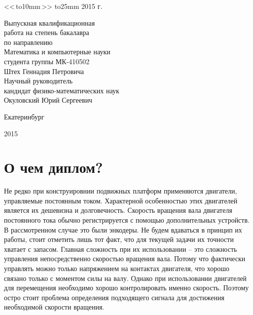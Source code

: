 \documentclass[14pt]{extreport}
\begin{document}
\begin{titlepage}
{\begin{parbox}[t]{9cm}
{                <<\,\hbox to10mm{\hrulefill}\,>>  \hbox to25mm{\hrulefill}  2015 г.
            }
            \end{parbox}
            \begin{parbox}[t]{9cm}{\small  {}
                Выпускная квалификационная \\
                работа на степень бакалавра\\
                 по направлению\\
                Математика и компьютерные науки\\
                студента группы МК-410502 \\
                                \bigskip
                Штех Геннадия Петровича\\
                Научный руководитель\\
                кандидат физико-математических наук \\
                Окуловский Юрий Сергеевич\\
            }
            \end{parbox}
        \vfill
        \centerline{Екатеринбург}
        \centerline{2015}
        }\restoregeometry
    \end{titlepage}
\newpage
    \tableofcontents

\newpage
    \chapter{О чем диплом?}
        Не редко при конструировнии подвижных платформ применяются двигатели, управляемые постоянным током. Характерной особенностью этих двигателей является их дешевизна и долговечность. Скорость вращения вала двигателя постоянного тока обычно регистрируется с помощью дополнительных устройств. В рассмотренном случае это были энкодеры. Не будем вдаваться в принцип их работы, стоит отметить лишь тот факт, что для текущей задачи их точности хватает с запасом. Главная сложность при их использовании -- это сложность управления непосредственно скоростью вращения вала. Потому что фактически управлять можно только напряжением на контактах двигателя, что хорошо связано только с моментом силы на валу. Однако при использовании двигателей для перемещения необходимо хорошо контролировать именно скорость. Поэтому остро стоит проблема определения подходящего сигнала для достижения необходимой скорости вращения.
\end{document}
